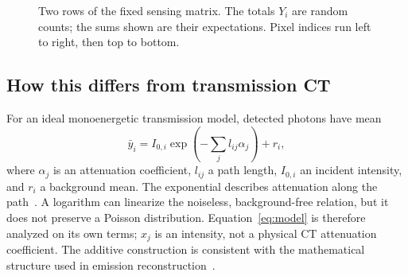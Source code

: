 \documentclass[11pt,a4paper]{article}
\begin{document}
\begin{figure}[H]
\centering
{}
\caption{Two rows of the fixed sensing matrix. The totals $Y_i$ are random counts; the sums shown are their expectations. Pixel indices run left to right, then top to bottom.}
\end{figure}

\subsection*{How this differs from transmission CT}
For an ideal monoenergetic transmission model, detected photons have mean
\begin{equation}
 \bar y_i=I_{0,i}\exp\!\left(-\sum_j l_{ij}\alpha_j\right)+r_i,
 \label{eq:transmission}
\end{equation}
where $\alpha_j$ is an attenuation coefficient, $l_{ij}$ a path length, $I_{0,i}$ an incident intensity, and $r_i$ a background mean. The exponential describes attenuation along the path~\cite{miqueles}. A logarithm can linearize the noiseless, background-free relation, but it does not preserve a Poisson distribution. Equation~\eqref{eq:model} is therefore analyzed on its own terms; $x_j$ is an intensity, not a physical CT attenuation coefficient. The additive construction is consistent with the mathematical structure used in emission reconstruction~\cite{shepp}.
\end{document}
